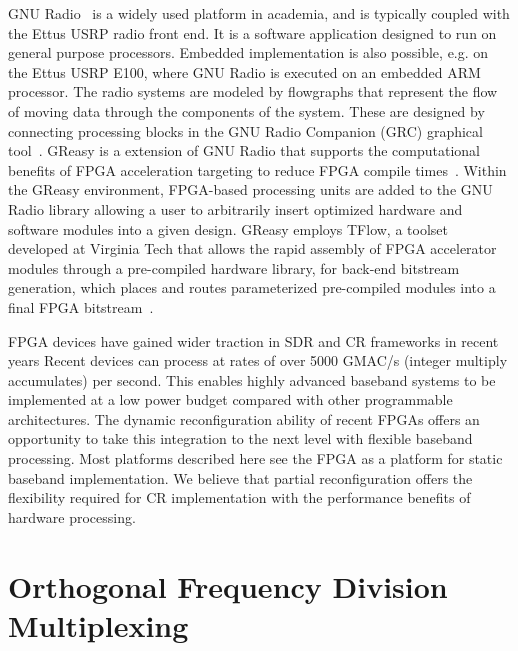 GNU Radio~\cite{gnuradio} is a widely used platform in academia, and is typically coupled with the Ettus USRP radio front end.
It is a software application designed to run on general purpose processors.
Embedded implementation is also possible, e.g. on the Ettus USRP E100, where GNU Radio is executed on an embedded ARM processor.
The radio systems are modeled by flowgraphs that represent the flow of moving data through the components of the system.
These are designed by connecting processing blocks in the GNU Radio Companion (GRC) graphical tool~\cite{GRC2009}.
GReasy is a extension of GNU Radio that supports the computational benefits of FPGA acceleration targeting to reduce FPGA compile times~\cite{Marlow2014}. Within the GReasy environment, FPGA-based processing units are added to the GNU Radio library allowing a user to arbitrarily insert optimized hardware and software modules into a given design. GReasy employs TFlow, a  toolset developed at Virginia Tech that allows the rapid assembly of FPGA accelerator modules through a pre-compiled hardware library, for back-end bitstream generation, which places and routes parameterized pre-compiled modules into a final FPGA bitstream~\cite{Love2013}.

FPGA devices have gained wider traction in SDR and CR frameworks in recent years
Recent devices can process at rates of over 5000 GMAC/s (integer multiply accumulates) per second. This enables highly advanced baseband systems to be implemented at a low power budget compared with other programmable architectures.
The dynamic reconfiguration ability of recent FPGAs offers an opportunity to take this integration to the next level with flexible baseband processing.
Most platforms described here see the FPGA as a platform for static baseband implementation.
We believe that partial reconfiguration offers the flexibility required for CR implementation with the performance benefits of hardware processing.




\section{Orthogonal Frequency Division Multiplexing}

